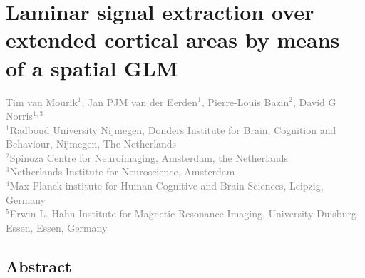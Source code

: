 
\chapter{Laminar signal extraction over extended cortical areas by means of a spatial GLM}
\label{ch:glm}

\textcolor{gray}{{Tim van Mourik$^{1}$}, Jan PJM van der Eerden$^{1}$, Pierre-Louis Bazin$^{2}$, David G Norris$^{1,3}$\\
$^{1}$Radboud University Nijmegen, Donders Institute for Brain, Cognition and Behaviour, Nijmegen, The Netherlands \\
$^{2}$Spinoza Centre for Neuroimaging, Amsterdam, the Netherlands \\
$^{3}$Netherlands Institute for Neuroscience, Amsterdam \\
$^{4}$Max Planck institute for Human Cognitive and Brain Sciences, Leipzig, Germany \\
$^{5}$Erwin L. Hahn Institute for Magnetic Resonance Imaging, University Duisburg-Essen, Essen, Germany}\\

\linespread{1.5}
\newpage
\section*{Abstract}

\newpage









